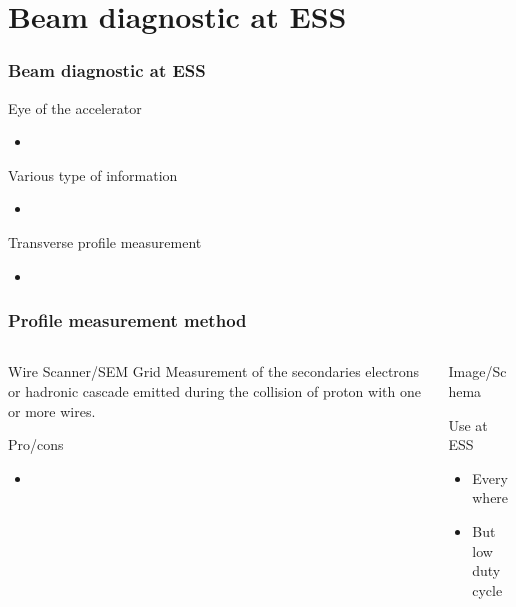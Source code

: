 \section{Beam diagnostic at ESS}

\begin{frame}
  \frametitle{Beam diagnostic at ESS}
  \begin{block}{Eye of the accelerator}
    \begin{itemize}
      \item
    \end{itemize}
  \end{block}
  \begin{block}{Various type of information}
    \begin{itemize}
      \item
    \end{itemize}
  \end{block}
  \begin{block}{Transverse profile measurement}
    \begin{itemize}
      \item
    \end{itemize}
  \end{block}
\end{frame}

\begin{frame}
  \frametitle{Profile measurement method}
  \begin{columns}
    \begin{column}{0.45\textwidth}
      \begin{block}{Wire Scanner/SEM Grid}
        Measurement of the secondaries electrons or hadronic cascade emitted during the collision of proton with one or more wires.
      \end{block}
      \begin{block}{Pro/cons}
        \begin{itemize}
          \item
        \end{itemize}
      \end{block}
    \end{column}
    \begin{column}{0.45\textwidth}
      Image/Schema
      \begin{block}{Use at ESS}
        \begin{itemize}
          \item Everywhere
          \item But low duty cycle
        \end{itemize}
      \end{block}
    \end{column}
  \end{columns}
\end{frame}

